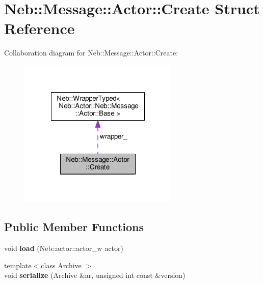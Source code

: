 \hypertarget{structNeb_1_1Message_1_1Actor_1_1Create}{\section{Neb\-:\-:Message\-:\-:Actor\-:\-:Create Struct Reference}
\label{structNeb_1_1Message_1_1Actor_1_1Create}
}


Collaboration diagram for Neb\-:\-:Message\-:\-:Actor\-:\-:Create\-:
\nopagebreak
\begin{figure}[H]
\begin{center}
\leavevmode
\includegraphics[width=216pt]{structNeb_1_1Message_1_1Actor_1_1Create__coll__graph}
\end{center}
\end{figure}
\subsection*{Public Member Functions}
\begin{DoxyCompactItemize}
\item 
\hypertarget{structNeb_1_1Message_1_1Actor_1_1Create_aff6ea433625795e13837dadbf4c36bca}{void {\bfseries load} (Neb\-::actor\-::actor\-\_\-w actor)}\label{structNeb_1_1Message_1_1Actor_1_1Create_aff6ea433625795e13837dadbf4c36bca}

\item 
\hypertarget{structNeb_1_1Message_1_1Actor_1_1Create_a4805dfe7cf6d556732278330dd7f7c44}{{\footnotesize template$<$class Archive $>$ }\\void {\bfseries serialize} (Archive \&ar, unsigned int const \&version)}\label{structNeb_1_1Message_1_1Actor_1_1Create_a4805dfe7cf6d556732278330dd7f7c44}

\end{DoxyCompactItemize}
